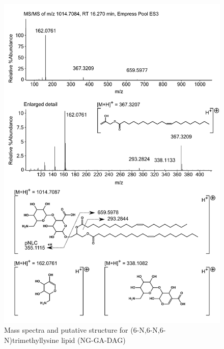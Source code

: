 \begin{figure}[h]
\centering
\includegraphics[width=\linewidth]{figs_app1/NG-GA-DAG}
\caption{Mass spectra and putative structure for (6-N,6-N,6-N)trimethyllysine lipid (NG-GA-DAG)}
\label{fig:NG-GA-DAG}
\end{figure}

